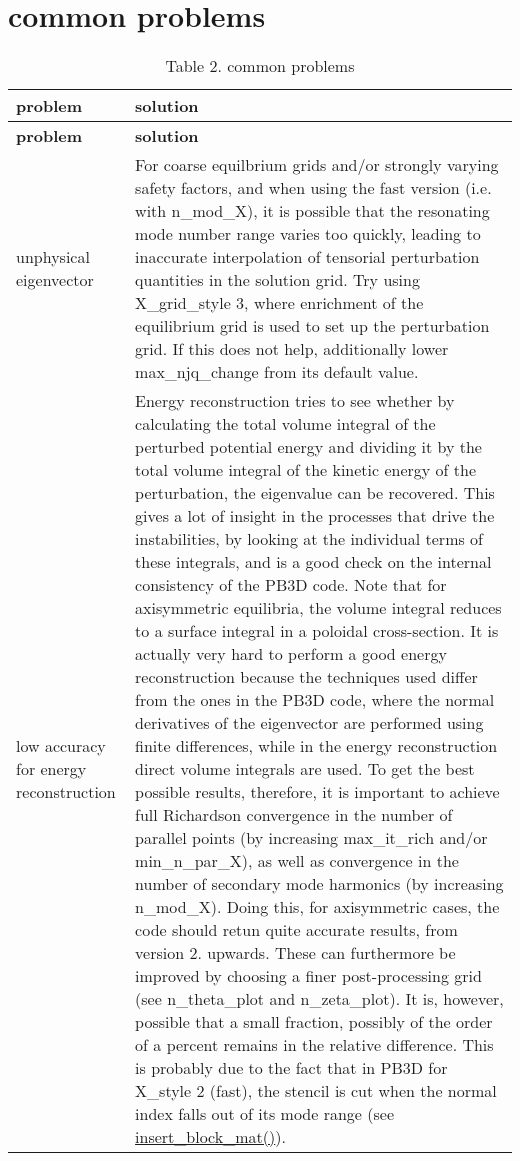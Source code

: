 \hypertarget{page_faq_faq_problems}{}\section{common problems}\label{page_faq_faq_problems}
\hypertarget{page_faq_faq_problems_tab}{}
\tabulinesep=1mm
\begin{longtabu} spread 0pt [c]{*{2}{|X[-1]}|}
\caption{Table 2. common problems}\label{page_faq_faq_problems_tab}\\
\hline
\rowcolor{\tableheadbgcolor}\textbf{ problem }&\textbf{ solution   }\\
\endfirsthead
\hline
\endfoot
\hline
\rowcolor{\tableheadbgcolor}\textbf{ problem }&\textbf{ solution   }\\
\endhead
unphysical eigenvector &For coarse equilbrium grids and/or strongly varying safety factors, and when using the fast version (i.\+e. with {\ttfamily n\+\_\+mod\+\_\+X}), it is possible that the resonating mode number range varies too quickly, leading to inaccurate interpolation of tensorial perturbation quantities in the solution grid. Try using {\ttfamily X\+\_\+grid\+\_\+style} 3, where enrichment of the equilibrium grid is used to set up the perturbation grid. If this does not help, additionally lower {\ttfamily max\+\_\+njq\+\_\+change} from its default value.   \\
low accuracy for energy reconstruction &Energy reconstruction tries to see whether by calculating the total volume integral of the perturbed potential energy and dividing it by the total volume integral of the kinetic energy of the perturbation, the eigenvalue can be recovered. This gives a lot of insight in the processes that drive the instabilities, by looking at the individual terms of these integrals, and is a good check on the internal consistency of the P\+B3D code. Note that for axisymmetric equilibria, the volume integral reduces to a surface integral in a poloidal cross-\/section. It is actually very hard to perform a good energy reconstruction because the techniques used differ from the ones in the P\+B3D code, where the normal derivatives of the eigenvector are performed using finite differences, while in the energy reconstruction direct volume integrals are used. To get the best possible results, therefore, it is important to achieve full Richardson convergence in the number of parallel points (by increasing {\ttfamily max\+\_\+it\+\_\+rich} and/or {\ttfamily min\+\_\+n\+\_\+par\+\_\+X}), as well as convergence in the number of secondary mode harmonics (by increasing {\ttfamily n\+\_\+mod\+\_\+X}). Doing this, for axisymmetric cases, the code should retun quite accurate results, from version 2. upwards. These can furthermore be improved by choosing a finer post-\/processing grid (see {\ttfamily n\+\_\+theta\+\_\+plot} and {\ttfamily n\+\_\+zeta\+\_\+plot}). It is, however, possible that a small fraction, possibly of the order of a percent remains in the relative difference. This is probably due to the fact that in P\+B3D for {\ttfamily X\+\_\+style} 2 (fast), the stencil is cut when the normal index falls out of its mode range (see \hyperlink{namespaceslepc__utilities_aa34aa361f0bfff9621ecba179f9ed0c6}{insert\+\_\+block\+\_\+mat()}).   \\
\end{longtabu}
